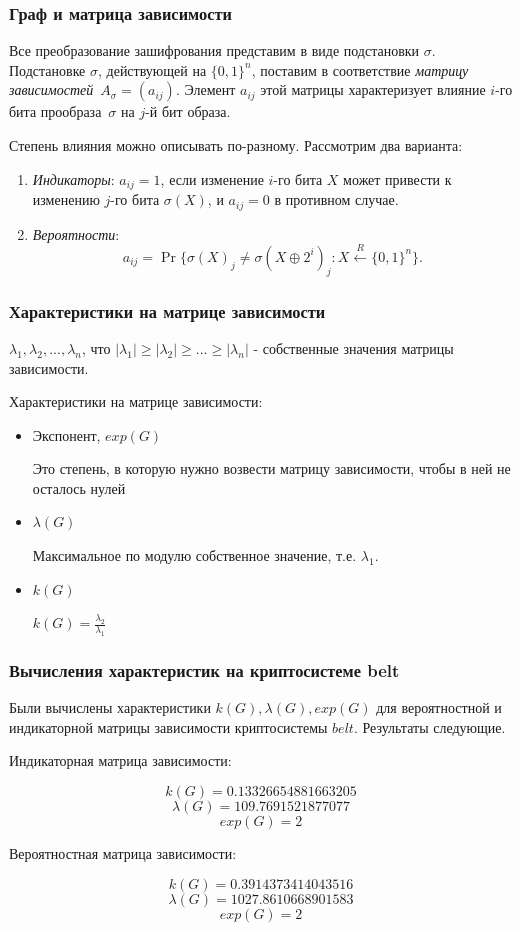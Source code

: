\documentclass{beamer}
\begin{document}
 \begin{frame}
    \frametitle{Граф и матрица зависимости}

Все преобразование зашифрования представим в виде подстановки $\sigma$.
Подстановке $\sigma$, действующей на $\{0,1\}^n$, 
поставим в соответствие {\it матрицу зависимостей}~$A_\sigma=(a_{ij})$.
Элемент $a_{ij}$ этой матрицы характеризует влияние $i$-го
бита прообраза~$\sigma$ на $j$-й бит образа.

Степень влияния можно описывать по-разному.
Рассмотрим два варианта:
\begin{enumerate}
\item
{\it Индикаторы}: $a_{ij}=1$,
если изменение $i$-го бита $X$ может привести 
к изменению $j$-го бита $\sigma(X)$,
и $a_{ij}=0$ в противном случае.

\item
{\it Вероятности}: 
$$
a_{ij}=\Pr\big\{\sigma(X)_j\neq \sigma(X\oplus 2^i)_j\colon
X\stackrel{R}\leftarrow\{0,1\}^n\big\}.
$$
\end{enumerate}
  \end{frame}

\begin{frame}
    \frametitle{Характеристики на матрице зависимости}

$\lambda_1, \lambda_2, ..., \lambda_n$, что $|\lambda_1| \ge |\lambda_2| \ge ... \ge |\lambda_n|$ - собственные значения матрицы зависимости.

Характеристики на матрице зависимости:

\begin{itemize}
\item Экспонент, $exp(G)$

Это степень, в которую нужно возвести матрицу зависимости, чтобы в ней не осталось нулей
\item $\lambda(G)$

Максимальное по модулю собственное значение, т.е. $\lambda_1$.
\item $k(G)$

$k(G) = \frac{\lambda_2}{\lambda_1}$
\end{itemize}

  \end{frame}

\begin{frame}
    \frametitle{Вычисления характеристик на криптосистеме belt}

Были вычислены характеристики $k(G), \lambda(G), exp(G)$ для вероятностной и индикаторной матрицы зависимости криптосистемы $belt$. Результаты следующие.

Индикаторная матрица зависимости:

$$k(G) = 0.13326654881663205$$
$$\lambda(G) = 109.7691521877077$$
$$exp(G) = 2$$

Вероятностная матрица зависимости:

$$k(G) = 0.3914373414043516$$
$$\lambda(G) = 1027.8610668901583$$
$$exp(G) = 2$$
  \end{frame}
\end{document}
